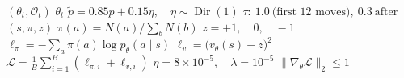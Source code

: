 \documentclass[multi=mathasset,border=0pt]{standalone}
\newenvironment{mathasset}{}{}
\begin{document}
\begin{mathasset}\fontsize{34bp}{44bp}\selectfont\color[HTML]{8052AD}\((\theta_t,\mathcal O_t)\)\end{mathasset}
\begin{mathasset}\fontsize{27bp}{34bp}\selectfont\color[HTML]{253044}\(\theta_t\)\end{mathasset}
\begin{mathasset}\fontsize{23bp}{34bp}\selectfont\color[HTML]{596779}\(\widetilde p=0.85p+0.15\eta,\quad\eta\sim\operatorname{Dir}(1)\)\end{mathasset}
\begin{mathasset}\fontsize{23bp}{32bp}\selectfont\color[HTML]{596779}\(\tau:\ 1.0\ \text{(first 12 moves)},\ 0.3\ \text{after}\)\end{mathasset}
\begin{mathasset}\fontsize{34bp}{44bp}\selectfont\color[HTML]{087F8C}\((s,\pi,z)\)\end{mathasset}
\begin{mathasset}\fontsize{26bp}{42bp}\selectfont\color[HTML]{253044}\(\pi(a)=N(a)\big/\sum_b N(b)\)\end{mathasset}
\begin{mathasset}\fontsize{27bp}{36bp}\selectfont\color[HTML]{253044}\(z=+1,\quad0,\quad-1\)\end{mathasset}
\begin{mathasset}\fontsize{28bp}{44bp}\selectfont\color[HTML]{253044}\(\ell_\pi=-\sum_a\pi(a)\log p_\theta(a\mid s)\)\end{mathasset}
\begin{mathasset}\fontsize{28bp}{42bp}\selectfont\color[HTML]{253044}\(\ell_v=\bigl(v_\theta(s)-z\bigr)^2\)\end{mathasset}
\begin{mathasset}\fontsize{28bp}{54bp}\selectfont\color[HTML]{253044}\(\mathcal L=\frac{1}{B}\sum_{i=1}^{B}(\ell_{\pi,i}+\ell_{v,i})\)\end{mathasset}
\begin{mathasset}\fontsize{24bp}{34bp}\selectfont\color[HTML]{596779}\(\eta=8\times10^{-5},\quad\lambda=10^{-5}\)\end{mathasset}
\begin{mathasset}\fontsize{25bp}{36bp}\selectfont\color[HTML]{596779}\(\|\nabla_\theta\mathcal L\|_2\le1\)\end{mathasset}
\end{document}
